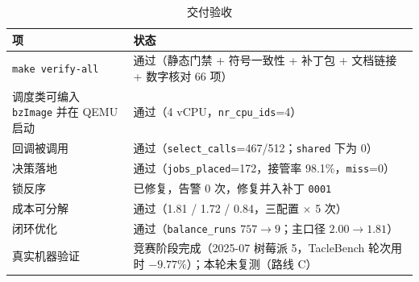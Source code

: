 \begin{table}[H]
\centering
\caption{交付验收}
\label{tab:accept}
\small
\begin{tabular}{@{}p{5.4cm}p{8.4cm}@{}}
\toprule
项 & 状态 \\
\midrule
\texttt{make verify-all} & 通过（静态门禁 + 符号一致性 + 补丁包 + 文档链接 + 数字核对 66 项） \\
调度类可编入 \texttt{bzImage} 并在 QEMU 启动 & 通过（4 vCPU，\texttt{nr\_cpu\_ids}=4） \\
回调被调用 & 通过（\texttt{select\_calls}=467/512；\texttt{shared} 下为 0） \\
决策落地 & 通过（\texttt{jobs\_placed}=172，接管率 98.1\%，\texttt{miss}=0） \\
锁反序 & 已修复，告警 0 次，修复并入补丁 \texttt{0001} \\
成本可分解 & 通过（1.81 / 1.72 / 0.84，三配置 $\times$ 5 次） \\
闭环优化 & 通过（\texttt{balance\_runs} $757\to9$；主口径 $2.00\to1.81$） \\
真实机器验证 & 竞赛阶段完成（2025-07 树莓派 5，TacleBench 轮次用时 $-9.77\%$）；本轮未复测（路线 C） \\
\bottomrule
\end{tabular}
\end{table}